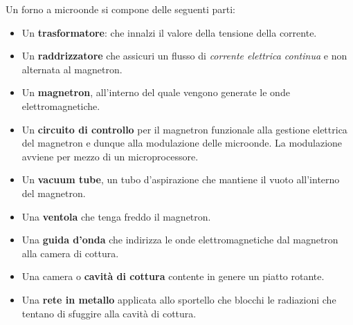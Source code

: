 \documentclass{article}
\begin{document}
Un forno a microonde si compone delle seguenti parti: 
\begin{itemize}[noitemsep]
\item Un \textbf{trasformatore}: che innalzi il valore della tensione della corrente. 
\item Un \textbf{raddrizzatore} che assicuri un flusso di \textit{corrente elettrica continua} e non alternata al magnetron.
\item  Un\textbf{ magnetron}, all'interno del quale vengono generate le onde elettromagnetiche.
\item Un \textbf{circuito di controllo} per il magnetron funzionale alla gestione elettrica del magnetron e dunque alla modulazione delle microonde. La modulazione avviene per mezzo di un microprocessore. 
\item Un \textbf{vacuum tube}, un tubo d'aspirazione che mantiene il vuoto all'interno del magnetron.
\item Una \textbf{ventola} che tenga freddo il magnetron.
\item Una \textbf{guida d’onda} che indirizza le onde elettromagnetiche dal magnetron alla camera di cottura.
\item Una camera o \textbf{cavità di cottura}  contente in genere un piatto rotante.
\item Una\textbf{ rete in metallo} applicata allo sportello che blocchi le radiazioni che tentano di sfuggire alla cavità di cottura.

\begin{figure}[h]
\centering
{}
\label{fig: cubed graph}
\end{figure}
\end{itemize}
\end{document}
